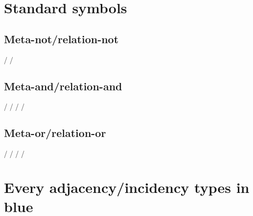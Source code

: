 \documentclass{article}
\begin{document}
\section{Standard symbols}

\GTStestNormalSymbolsCalls

\subsection{Meta-not/relation-not}

\GTStestText{\GTSmN/}{\GTSmN/}

\GTStestText{\GTSxml[not]}{\GTSxml[n]}


\GTStestEqualTextsI{\GTSmN/}{\GTSmN/}%
{\GTSmetaNot/}%
{\GTSmetaNot/}

\subsection{Meta-and/relation-and}

\GTStestText{\GTSmA/}{\GTSmAR/}

\GTStestText{\GTSxml[and]}{\GTSxml[a,r]}


\GTStestEqualTextsI{\GTSmA/}{\GTSmAR/}%
{\GTSmetaAnd/}%
{\GTSmetaAndRelation/}
\GTStestEqualTextsI{\GTSmA/}{\GTSmAR/}%
{\GTSmetaAnd/}%
{\GTSmetaAndRel/}

\subsection{Meta-or/relation-or}

\GTStestText{\GTSmO/}{\GTSmOR/}

\GTStestText{\GTSxml[or]}{\GTSxml[o,r]}


\GTStestEqualTextsI{\GTSmO/}{\GTSmOR/}%
{\GTSmetaOr/}%
{\GTSmetaOrRelation/}
\GTStestEqualTextsI{\GTSmO/}{\GTSmOR/}%
{\GTSmetaOr/}%
{\GTSmetaOrRel/}



\section{Every adjacency/incidency types in blue}


\GTStestNormalSymbolsCalls
\end{document}
